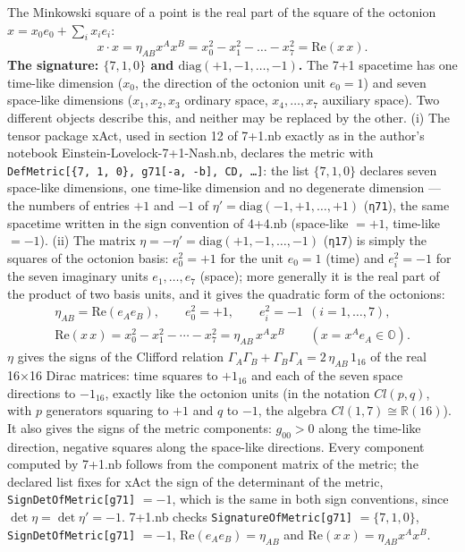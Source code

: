 \documentclass[10pt,a4paper]{article}
\begin{document}
The Minkowski square of a point is the real part of the square of the octonion $x=x_0e_0+\sum_ix_ie_i$:
\begin{equation*}
x\cdot x=\eta_{AB}x^Ax^B=x_0^2-x_1^2-\dots-x_7^2=\mathrm{Re}(x\,x).
\end{equation*}
\textbf{The signature: $\{7,1,0\}$ and $\mathrm{diag}(+1,-1,\dots,-1)$.} The 7+1 spacetime has one time-like dimension ($x_0$, the direction of the octonion unit $e_0=1$) and seven space-like dimensions ($x_1,x_2,x_3$ ordinary space, $x_4,\dots,x_7$ auxiliary space). Two different objects describe this, and neither may be replaced by the other. (i) The tensor package xAct, used in section 12 of 7+1.nb exactly as in the author’s notebook Einstein-Lovelock-7+1-Nash.nb, declares the metric with \texttt{DefMetric[\{7, 1, 0\}, g71[-a, -b], CD, …]}: the list $\{7,1,0\}$ declares seven space-like dimensions, one time-like dimension and no degenerate dimension — the numbers of entries $+1$ and $-1$ of $\eta'=\mathrm{diag}(-1,+1,\dots,+1)$ (\texttt{η71}), the same spacetime written in the sign convention of 4+4.nb (space-like $=+1$, time-like $=-1$). (ii) The matrix $\eta=-\eta'=\mathrm{diag}(+1,-1,\dots,-1)$ (\texttt{η17}) is simply the squares of the octonion basis: $e_0^2=+1$ for the unit $e_0=1$ (time) and $e_i^2=-1$ for the seven imaginary units $e_1,\dots,e_7$ (space); more generally it is the real part of the product of two basis units, and it gives the quadratic form of the octonions:
\begin{gather*}
\eta_{AB}=\mathrm{Re}(e_Ae_B),\qquad e_0^2=+1,\qquad e_i^2=-1\ \ (i=1,\dots,7),\\ \mathrm{Re}(x\,x)=x_0^2-x_1^2-\cdots-x_7^2=\eta_{AB}\,x^Ax^B\qquad (x=x^Ae_A\in\mathbb O).
\end{gather*}
$\eta$ gives the signs of the Clifford relation $\Gamma_A\Gamma_B+\Gamma_B\Gamma_A=2\,\eta_{AB}\,1_{16}$ of the real 16×16 Dirac matrices: time squares to $+1_{16}$ and each of the seven space directions to $-1_{16}$, exactly like the octonion units (in the notation $Cl(p,q)$, with $p$ generators squaring to $+1$ and $q$ to $-1$, the algebra $Cl(1,7)\cong\mathbb R(16)$). It also gives the signs of the metric components: $g_{00}>0$ along the time-like direction, negative squares along the space-like directions. Every component computed by 7+1.nb follows from the component matrix of the metric; the declared list fixes for xAct the sign of the determinant of the metric, \texttt{SignDetOfMetric[g71]} $=-1$, which is the same in both sign conventions, since $\det \eta=\det \eta'=-1$. 7+1.nb checks \texttt{SignatureOfMetric[g71]} $=\{7,1,0\}$, \texttt{SignDetOfMetric[g71]} $=-1$, $\mathrm{Re}(e_Ae_B)=\eta_{AB}$ and $\mathrm{Re}(x\,x)=\eta_{AB}x^Ax^B$.
\end{document}

